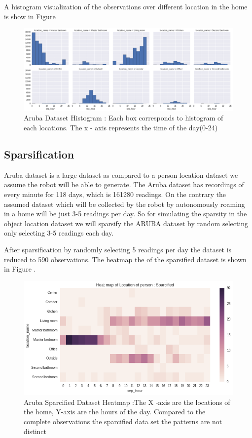 \documentclass[12pt,parskip=half, DIV=calc, BCOR=10mm, x11names]{scrbook}
\begin{document}
A histogram visualization of the observations over different location in the home is show in Figure \cite{aruba-hist}

\begin{figure}[htp]
\centering
\includegraphics[width=\textwidth]{images/aruba-hist.png}
\caption{Aruba Dataset Histogram : Each box corresponds to histogram of each locations. The x - axis represents the time of the day(0-24) }
\label{aruba-hist}
\end{figure}


\subsection*{Sparsification}
Aruba dataset is a large dataset as compared to a person location dataset we assume the robot will be able to generate. The Aruba dataset has recordings of every minute for 118 days, which is 161280 readings.
On the contrary the assumed dataset which will be collected by the robot by autonomously roaming in a home will be just 3-5 readings per day.
So for simulating the sparsity in the object location dataset we will sparsify the ARUBA dataset by random selecting only selecting 3-5 readings each day.

After sparsification by randomly selecting 5 readings per day the dataset is reduced to 590 observations. The heatmap the of the sparsified dataset is shown in Figure \cite{aruba-reduced-hist}. 

\begin{figure}[htp]
\centering
\includegraphics[width=\textwidth]{images/aruba-reduced-heatmap.png}
\caption{Aruba Sparcified Dataset Heatmap :The X -axis are the locations of the home, Y-axis are the hours of the day. Compared to the complete observations the sparcified data set the patterns are not distinct}
\label{aruba-reduced-hist}
\end{figure}
\end{document}
